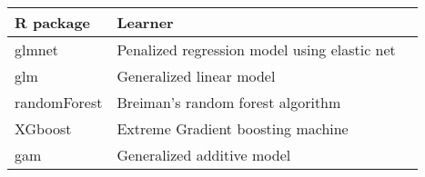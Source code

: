 \documentclass{report}
\begin{document}
\centering
\begin{tabular}{llr}
\toprule
R package      & Learner \\
\midrule
glmnet       & Penalized regression model using elastic net  \\
glm          & Generalized linear model      \\
randomForest & Breiman's random forest algorithm   \\
XGboost      & Extreme Gradient boosting machine      \\
gam          & Generalized additive model      \\
\bottomrule
\end{tabular}
\end{document}
